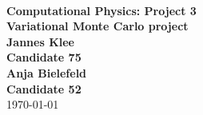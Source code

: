 \begin{titlepage}
\\

    \vspace{3.5cm}
    \center
    {\hspace{5mm}\Large\bf Computational Physics: Project 3}\\
    \vspace{1.5cm}
    {\hspace{5mm}\huge\textbf{Variational Monte Carlo project}}\\
    \vspace{4cm}
    {\hspace{5mm}\Large\bf Jannes Klee}\\
    {\hspace{5mm}\bf Candidate 75}\\
    \vspace{1cm}
    {\hspace{5mm}\Large\bf Anja Bielefeld}\\
    {\hspace{5mm}\bf Candidate 52}\\
    \vspace{1.5cm}
    {\hspace{5mm}\large \today}\\
    \vspace{1.5cm}
\end{titlepage}
\tableofcontents
